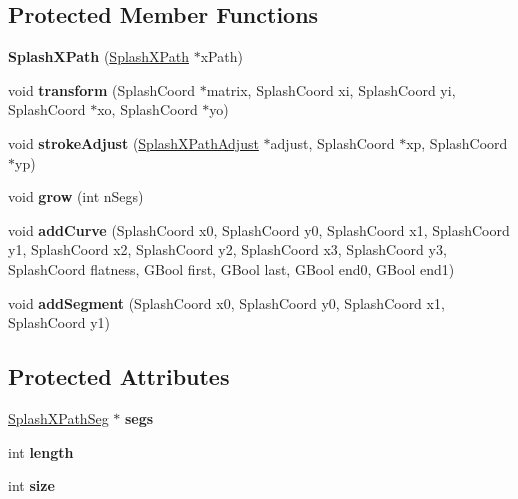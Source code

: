 \subsection*{Protected Member Functions}
\begin{DoxyCompactItemize}
\item 
\mbox{\label{class_splash_x_path_a3a6c6ba2f2962486a3438bcc02f91ab3}} 
{\bfseries Splash\+X\+Path} (\hyperlink{class_splash_x_path}{Splash\+X\+Path} $\ast$x\+Path)
\item 
\mbox{\label{class_splash_x_path_af236d775696ed3c90abff32559b4dec5}} 
void {\bfseries transform} (Splash\+Coord $\ast$matrix, Splash\+Coord xi, Splash\+Coord yi, Splash\+Coord $\ast$xo, Splash\+Coord $\ast$yo)
\item 
\mbox{\label{class_splash_x_path_af188235a04d2648d9cc5abd24803c4f3}} 
void {\bfseries stroke\+Adjust} (\hyperlink{struct_splash_x_path_adjust}{Splash\+X\+Path\+Adjust} $\ast$adjust, Splash\+Coord $\ast$xp, Splash\+Coord $\ast$yp)
\item 
\mbox{\label{class_splash_x_path_a756e88ea57bfe1202bd1a101698d798e}} 
void {\bfseries grow} (int n\+Segs)
\item 
\mbox{\label{class_splash_x_path_a659c917a3bcf32332f6891a8c597cf97}} 
void {\bfseries add\+Curve} (Splash\+Coord x0, Splash\+Coord y0, Splash\+Coord x1, Splash\+Coord y1, Splash\+Coord x2, Splash\+Coord y2, Splash\+Coord x3, Splash\+Coord y3, Splash\+Coord flatness, G\+Bool first, G\+Bool last, G\+Bool end0, G\+Bool end1)
\item 
\mbox{\label{class_splash_x_path_a0329bbd5823e7838b2f1d08935a5a25d}} 
void {\bfseries add\+Segment} (Splash\+Coord x0, Splash\+Coord y0, Splash\+Coord x1, Splash\+Coord y1)
\end{DoxyCompactItemize}
\subsection*{Protected Attributes}
\begin{DoxyCompactItemize}
\item 
\mbox{\label{class_splash_x_path_ae65ffe731abae802a8410d3819b6fef1}} 
\hyperlink{struct_splash_x_path_seg}{Splash\+X\+Path\+Seg} $\ast$ {\bfseries segs}
\item 
\mbox{\label{class_splash_x_path_a18fd6bb2be5bc645ed8544b573d86e97}} 
int {\bfseries length}
\item 
\mbox{\label{class_splash_x_path_a4b905411b2706199615b98bc503b3236}} 
int {\bfseries size}
\end{DoxyCompactItemize}
